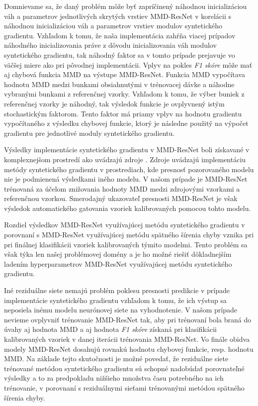 Domnievame sa, že daný problém môže byť zapríčinený náhodnou inicializáciou váh a parametrov jednotlivých skrytých vrstiev MMD-ResNet v korelácii s náhodnou inicializáciou váh a parametrov vrstiev modulov syntetického gradientu. Vzhľadom k tomu, že naša implementácia zahŕňa viacej prípadov náhodného inicializovania práve z dôvodu inicializovania váh modulov syntetického gradientu, tak náhodný faktor sa v tomto prípade prejavuje vo väčšej miere ako pri pôvodnej implementácii. Vplyv na pokles \textit{F1 skóre} môže mať aj chybová funkcia MMD na výstupe MMD-ResNet. Funkcia MMD vypočítava hodnotu MMD medzi bunkami obsiahnutými v trénovacej dávke a náhodne vybranými bunkami z referenčnej vzorky. Vzhľadom k tomu, že výber buniek z referenčnej vzorky je náhodný, tak výsledok funkcie je ovplyvnený istým stochastickým faktorom. Tento faktor má priamy vplyv na hodnotu gradientu vypočítaného z výsledku chybovej funkcie, ktorý je následne použitý na výpočet gradientu pre jednotlivé moduly syntetického gradientu.

Výsledky implementácie syntetického gradientu v MMD-ResNet boli získavané v komplexnejšom prostredí ako uvádzajú zdroje \cite{Jaderberg2016, Czarnecki2017}. Zdroje uvádzajú implementáciu metódy syntetického gradientu v prostrediach, kde presnosť pozorovaného modelu nie je podmienená výsledkami iného modelu. V našom prípade je MMD-ResNet trénovaná za účelom znižovania hodnoty MMD medzi zdrojovými vzorkami a referenčnou vzorkou. Smerodajný ukazovateľ presnosti MMD-ResNet je však výsledok automatického gatovania vzoriek kalibrovaných pomocou tohto modelu.

Rozdiel výsledkov MMD-ResNet využívajúcej metódu syntetického gradientu v porovnaní s MMD-ResNet využívajúcej metódu spätného šírenia chyby vznika pri pri finálnej klasifikácii vzoriek kalibrovaných týmito modelmi. Tento problém sa však týka len našej problémovej domény a je ho možné riešiť dôkladnejším ladením hyperparametrov MMD-ResNet využívajúcej metódu syntetického gradientu.

Iné reziduálne siete nemajú problém poklesu presnosti predikcie v prípade implementácie syntetického gradientu vzhľadom k tomu, že ich výstup sa neposiela inému modelu neurónovej siete na vyhodnotenie. V našom prípade nevieme ovplyvniť trénovanie MMD-ResNet tak, aby pri trénovaní bola braná do úvahy aj hodnota MMD a aj hodnota \textit{F1 skóre} získaná pri klasifikácii kalibrovaných vzoriek v danej iterácii trénovania MMD-ResNet. Vo finále obidva modely MMD-ResNet dosahujú rovnakú hodnotu chybovej funkcie, resp. hodnotu MMD. Na základe tejto skutočnosti je možné povedať, že reziduálne siete trénované metódou syntetického gradientu sú schopné nadobúdať porovnateľné výsledky a to za predpokladu nižšieho množstva času potrebného na ich trénovanie, v porovnaní s reziduálnymi sieťami trénovanými metódou spätného šírenia chyby.

